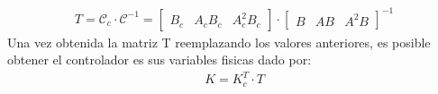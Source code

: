 \documentclass[
  11pt,
  letterpaper,
   addpoints,
   answers
  ]{exam}
\begin{document}
\begin{questions}
\begin{solution}
\begin{align}
    T = \mathcal{C}_c \cdot \mathcal{C}^{-1} = 
\begin{bmatrix}
B_c & A_c B_c & A_c^2 B_c
\end{bmatrix}
\cdot
\begin{bmatrix}
B & AB & A^2B
\end{bmatrix}^{-1}
\end{align}
Una vez obtenida la matriz T reemplazando los valores anteriores, es posible obtener el controlador es sus variables fisicas dado por:
\begin{align}
    K = K_c^T \cdot T
\end{align}
\end{solution}

\end{questions}
\newpage
\end{document}
